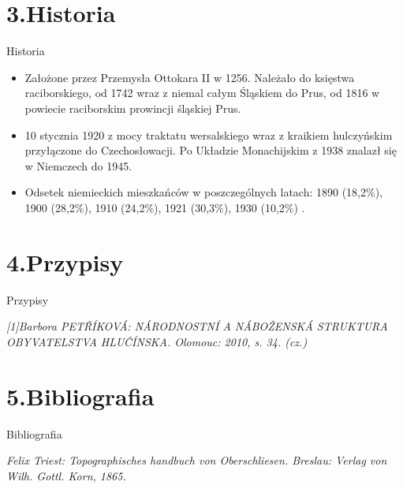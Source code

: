 \documentclass{beamer}
\begin{document}
\section{3.Historia}
\begin{frame}{Historia}
\begin{itemize}
\item{Założone przez Przemysła Ottokara II w 1256. Należało do księstwa raciborskiego, od 1742 wraz z niemal całym Śląskiem do Prus, od 1816 w powiecie raciborskim prowincji śląskiej Prus.}
\pause
\item{10 stycznia 1920 z mocy traktatu wersalskiego wraz z kraikiem hulczyńskim przyłączone do Czechosłowacji. Po Układzie Monachijskim z 1938 znalazł się w Niemczech do 1945.}
\pause
\item{Odsetek niemieckich mieszkańców w poszczególnych latach: 1890 (18,2\%), 1900 (28,2\%), 1910 (24,2\%), 1921 (30,3\%), 1930 (10,2\%) .}
\end{itemize}
\end{frame}

\section{4.Przypisy}
\begin{frame}{Przypisy}
\begin{thebibliography}{99}
\textit{[1]Barbora PETŘÍKOVÁ: NÁRODNOSTNÍ A NÁBOŽENSKÁ STRUKTURA OBYVATELSTVA HLUČÍNSKA. Olomouc: 2010, s. 34. (cz.)}
\end{thebibliography}
\end{frame}

\section{5.Bibliografia}
\begin{frame}{Bibliografia}
\begin{thebibliography}{99}
\textit{Felix Triest: Topographisches handbuch von Oberschliesen. Breslau: Verlag von Wilh. Gottl. Korn, 1865.}
\end{thebibliography}
\end{frame}
\end{document}
